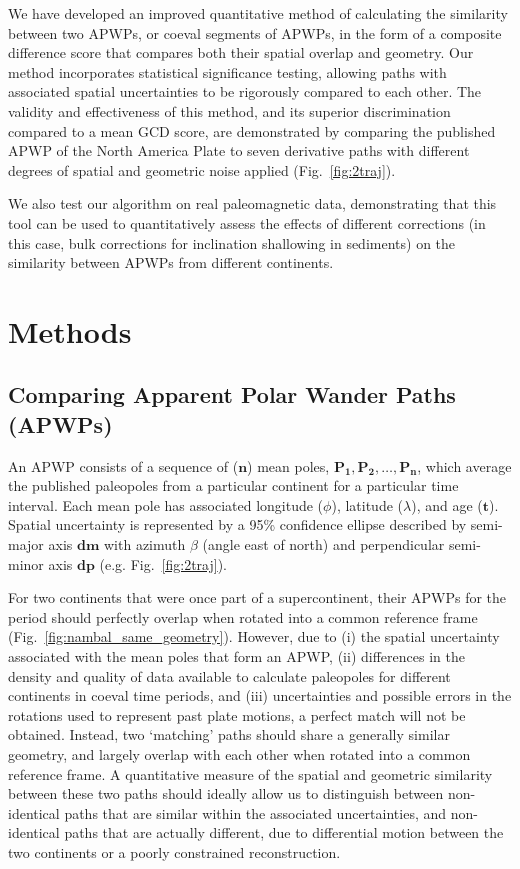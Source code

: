 We have developed an improved quantitative method of calculating the similarity
between two APWPs, or coeval segments of APWPs, in the form of a composite
difference score that compares both their spatial overlap and geometry. Our
method incorporates statistical significance testing, allowing paths with
associated spatial uncertainties to be rigorously compared to each other. The
validity and effectiveness of this method, and its superior discrimination
compared to a mean GCD score, are demonstrated by comparing the published APWP
of the North America Plate to seven derivative paths with different degrees of
spatial and geometric noise applied (Fig.~\ref{fig:2traj}).

We also test our algorithm on real paleomagnetic data, demonstrating that this
tool can be used to quantitatively assess the effects of different corrections
(in this case, bulk corrections for inclination shallowing in sediments) on the
similarity between APWPs from different continents.

\section{Methods}

\subsection{Comparing Apparent Polar Wander Paths (APWPs)}

An APWP consists of a sequence of ($\mathbf{n}$) mean poles,
$\mathbf{P_1,P_2,\ldots,P_n}$, which average the published paleopoles from a
particular continent for a particular time interval. Each mean pole has
associated longitude ($\phi$), latitude ($\lambda$), and age ($\mathbf{t}$).
Spatial uncertainty is represented by a 95\% confidence ellipse described by
semi-major axis $\mathbf{dm}$ with azimuth $\beta$ (angle east of north) and
perpendicular semi-minor axis $\mathbf{dp}$ (e.g. Fig.~\ref{fig:2traj}).

For two continents that were once part of a supercontinent, their APWPs for the
period should perfectly overlap when rotated into a common reference frame
(Fig.~\ref{fig:nambal_same_geometry}). However, due to (i) the spatial
uncertainty associated with the mean poles that form an APWP, (ii) differences
in the density and quality of data available to calculate paleopoles for
different continents in coeval time periods, and (iii) uncertainties and
possible errors in the rotations used to represent past plate motions, a perfect
match will not be obtained. Instead, two `matching' paths should share a
generally similar geometry, and largely overlap with each other when rotated
into a common reference frame. A quantitative measure of the spatial and
geometric similarity between these two paths should ideally allow us to
distinguish between non-identical paths that are similar within the associated
uncertainties, and non-identical paths that are actually different, due to
differential motion between the two continents or a poorly constrained
reconstruction.

